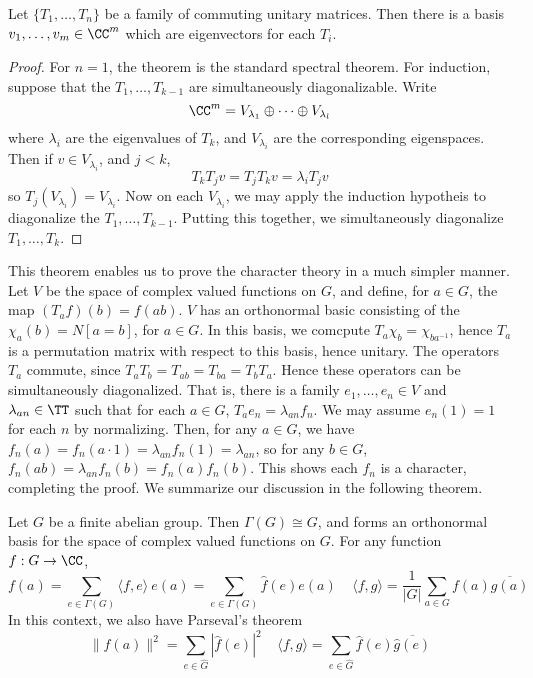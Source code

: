 \begin{theorem}
    Let $\{ T_1, \dots, T_n \}$ be a family of commuting unitary matrices. Then there is a basis $v_1, \dots, v_m \in \CC^m$ which are eigenvectors for each $T_i$.
\end{theorem}
\begin{proof}
    For $n = 1$, the theorem is the standard spectral theorem. For induction, suppose that the $T_1, \dots, T_{k-1}$ are simultaneously diagonalizable. Write
    \[ \CC^m = V_{\lambda_1} \oplus \dots \oplus V_{\lambda_l} \]
    where $\lambda_i$ are the eigenvalues of $T_k$, and $V_{\lambda_i}$ are the corresponding eigenspaces. Then if $v \in V_{\lambda_i}$, and $j < k$,
    \[ T_k T_j v = T_j T_k v = \lambda_i T_j v \]
    so $T_j(V_{\lambda_i}) = V_{\lambda_i}$. Now on each $V_{\lambda_i}$, we may apply the induction hypotheis to diagonalize the $T_1, \dots, T_{k-1}$. Putting this together, we simultaneously diagonalize $T_1, \dots, T_k$.
\end{proof}

This theorem enables us to prove the character theory in a much simpler manner. Let $V$ be the space of complex valued functions on $G$, and define, for $a \in G$, the map $(T_a f)(b) = f(ab)$. $V$ has an orthonormal basic consisting of the $\chi_a(b) = N [a = b]$, for $a \in G$. In this basis, we comcpute $T_a \chi_b = \chi_{ba^{-1}}$, hence $T_a$ is a permutation matrix with respect to this basis, hence unitary. The operators $T_a$ commute, since $T_aT_b = T_{ab} = T_{ba} = T_b T_a$. Hence these operators can be simultaneously diagonalized. That is, there is a family $e_1, \dots, e_n \in V$ and $\lambda_{an} \in \TT$ such that for each $a \in G$, $T_a e_n = \lambda_{an} f_n$. We may assume $e_n(1) = 1$ for each $n$ by normalizing. Then, for any $a \in G$, we have $f_n(a) = f_n(a \cdot 1) = \lambda_{an} f_n(1) = \lambda_{an}$, so for any $b \in G$, $f_n(ab) = \lambda_{an} f_n(b) = f_n(a) f_n(b)$. This shows each $f_n$ is a character, completing the proof. We summarize our discussion in the following theorem.

\begin{theorem}
    Let $G$ be a finite abelian group. Then $\Gamma(G) \cong G$, and forms an orthonormal basis for the space of complex valued functions on $G$. For any function $f: G \to \CC$,
    \[ f(a) = \sum_{e \in \Gamma(G)} \langle f, e \rangle\ e(a) = \sum_{e \in \Gamma(G)} \hat{f}(e) e(a)\ \ \ \ \ \langle f, g \rangle = \frac{1}{|G|} \sum_{a \in G} f(a) \overline{g(a)} \]
    In this context, we also have Parseval's theorem
    \[ \| f(a) \|^2 = \sum_{e \in \hat{G}} |\widehat{f}(e)|^2\ \ \ \ \ \langle f, g \rangle = \sum_{e \in \hat{G}} \widehat{f}(e) \overline{\widehat{g}(e)} \]
\end{theorem}

